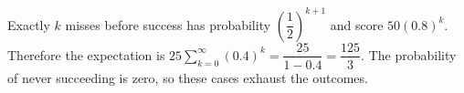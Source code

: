 Exactly $k$ misses before success has probability $(\dfrac{1}{2})^{k+1}$ and score $50(0.8)^k$. Therefore the expectation is $25\sum_{k=0}^\infty(0.4)^k=\dfrac{25}{1-0.4}=\boxed{\dfrac{125}{3}}$. The probability of never succeeding is zero, so these cases exhaust the outcomes.
